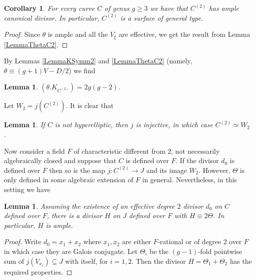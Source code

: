 \documentclass[11pt]{amsart}
\newtheorem{corollary}[theorem]{Corollary}
\newtheorem{lemma}[theorem]{Lemma}
\theoremstyle{remark}
\numberwithin{equation}{section}
\begin{document}
\begin{corollary} \label{LemmaSymm2GT} For every curve $C$ of genus $g\ge 3$  we have that $C^{(2)}$ has ample canonical divisor. In particular, $C^{(2)}$ is a surface of general type.
\end{corollary}
\begin{proof} Since $\theta$ is ample and all the $V_{\xi}$ are effective, we get the result from Lemma \ref{LemmaThetaC2}.
\end{proof}


By Lemmas \ref{LemmaKSymm2} and \ref{LemmaThetaC2} (namely, $\theta\equiv (g+1)V-D/2$) we find

\begin{lemma}\label{LemmaThetaK} $(\theta.K_{C^{(2)}})=2g(g-2)$. 
\end{lemma}


Let $W_2=j(C^{(2)})$. It is clear that

\begin{lemma}\label{LemmanonHypEll} If $C$ is not hyperelliptic, then $j$ is injective, in which case $C^{(2)}\simeq W_2$.
\end{lemma}

Now consider a field $F$ of characteristic different from $2$, not necessarily algebraically closed and suppose that $C$ is defined over $F$. If the divisor $d_0$ is defined over $F$ then so is the map $j:C^{(2)}\to J$ and its image $W_2$. However, $\Theta$ is only defined in some algebraic extension of $F$ in general. Nevertheless, in this setting we have

\begin{lemma}\label{LemmaTheta} Assuming the existence of an effective degree $2$ divisor $d_0$ on $C$ defined over $F$, there is a divisor $H$ on $J$ defined over $F$ with $H\equiv 2\Theta$. In particular, $H$ is ample.
\end{lemma}
\begin{proof} Write $d_0=x_1+x_2$ where $x_1,x_2$ are either $F$-rational or of degree $2$ over $F$ in which case they are Galois conjugate. Let $\Theta_i$ be the $(g-1)$-fold pointwise sum of $j(V_{x_i})\subseteq J$ with itself, for $i=1,2$. Then the divisor $H=\Theta_1+\Theta_2$ has the required properties.  
\end{proof}
\end{document}
